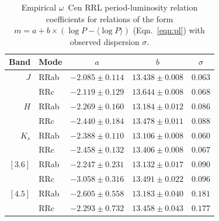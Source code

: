 \documentclass[a4paper,fleqn,usenatbib]{mnras}
\newcommand{\ocen}{$\omega$~Cen\xspace}
\begin{document}
\begin{table}
\centering
\caption{Empirical \ocen RRL period-luminosity relation coefficients for relations of the form ${m = a + b \times (\log P - \langle \log P \rangle)}$ (Eqn.~\ref{eqn:pl}) with observed dispersion $\sigma$.} 
\label{tab:pl_table}
\begin{tabular}{rlccc} 
\hline \hline
Band & Mode & $a$ & $b$ & $\sigma$ \\
\hline
     $J$ &  RRab &  $-2.085 \pm 0.114$ &  $13.438 \pm 0.008$ & $0.063$ \\
         &   RRc &  $-2.119 \pm 0.129$ &  $13.644 \pm 0.008$ & $0.068$ \\
     $H$ &  RRab &  $-2.269 \pm 0.160$ &  $13.184 \pm 0.012$ & $0.086$ \\
         &   RRc &  $-2.440 \pm 0.184$ &  $13.478 \pm 0.011$ & $0.088$ \\
   $K_s$ &  RRab &  $-2.388 \pm 0.110$ &  $13.106 \pm 0.008$ & $0.060$ \\
         &   RRc &  $-2.458 \pm 0.132$ &  $13.406 \pm 0.008$ & $0.067$ \\
 $[3.6]$ &  RRab &  $-2.247 \pm 0.231$ &  $13.132 \pm 0.017$ & $0.090$ \\
         &   RRc &  $-3.058 \pm 0.316$ &  $13.491 \pm 0.022$ & $0.096$ \\
 $[4.5]$ &  RRab &  $-2.605 \pm 0.558$ &  $13.183 \pm 0.040$ & $0.181$ \\
         &   RRc &  $-2.293 \pm 0.732$ &  $13.458 \pm 0.043$ & $0.177$ \\
\hline
\end{tabular}
\end{table}
\end{document}
